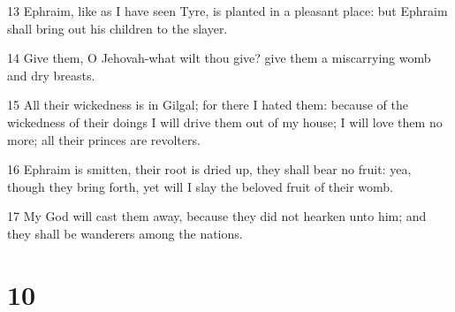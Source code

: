 \par 13 Ephraim, like as I have seen Tyre, is planted in a pleasant place: but Ephraim shall bring out his children to the slayer.
\par 14 Give them, O Jehovah-what wilt thou give? give them a miscarrying womb and dry breasts.
\par 15 All their wickedness is in Gilgal; for there I hated them: because of the wickedness of their doings I will drive them out of my house; I will love them no more; all their princes are revolters.
\par 16 Ephraim is smitten, their root is dried up, they shall bear no fruit: yea, though they bring forth, yet will I slay the beloved fruit of their womb.
\par 17 My God will cast them away, because they did not hearken unto him; and they shall be wanderers among the nations.

\chapter{10}

